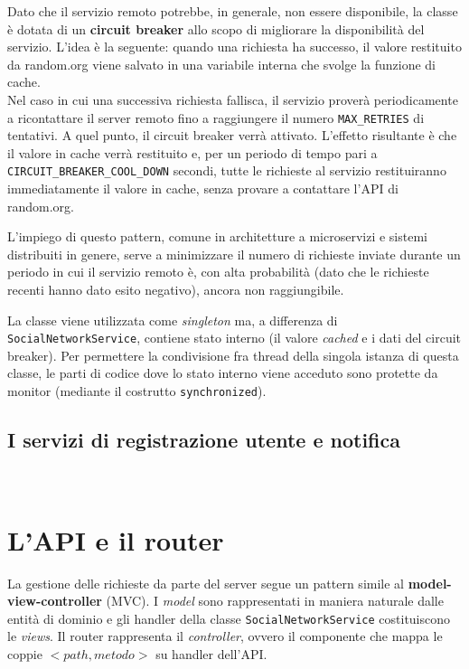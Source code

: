 \documentclass[a4paper,8pt]{article} %
\def\code#1{\texttt{#1}}
\begin{document}
\par Dato che il servizio remoto potrebbe, in generale, non essere disponibile, la classe è dotata di un \textbf{circuit breaker} allo scopo di migliorare la disponibilità del servizio.
L'idea è la seguente: quando una richiesta ha successo, il valore restituito da random.org viene salvato in una variabile interna che svolge la funzione di cache.\\
Nel caso in cui una successiva richiesta fallisca,
il servizio proverà periodicamente a ricontattare il server remoto fino a raggiungere il numero \code{MAX\_RETRIES} di tentativi. A quel punto, il circuit breaker verrà attivato. L'effetto risultante è che il valore in cache verrà
restituito e, per un periodo di tempo pari a \code{CIRCUIT\_BREAKER\_COOL\_DOWN} secondi, tutte le richieste al servizio restituiranno immediatamente il valore in cache, senza provare a contattare l'API di random.org.
\par L'impiego di questo pattern, comune in architetture a microservizi e sistemi distribuiti in genere, serve a minimizzare il numero di richieste inviate durante un periodo in cui il servizio remoto è, con alta probabilità (dato che le richieste recenti hanno dato esito negativo), ancora non raggiungibile.

\par La classe viene utilizzata come \emph{singleton} ma, a differenza di \code{SocialNetworkService}, contiene stato interno (il valore \emph{cached} e i dati del circuit breaker).
Per permettere la condivisione fra thread della singola istanza di questa classe, le parti di codice dove lo stato interno viene acceduto sono protette da monitor (mediante il costrutto \code{synchronized}).

\subsection{I servizi di registrazione utente e notifica}\quad \\




\section{L'API e il router}
La gestione delle richieste da parte del server segue un pattern simile al \textbf{model-view-controller} (MVC).
I \emph{model} sono rappresentati in maniera naturale dalle entità di dominio e gli handler della classe \code{SocialNetworkService} costituiscono
le \emph{views}. Il router rappresenta il \emph{controller}, ovvero il componente che mappa le coppie $<path, metodo>$ su handler dell'API.
\end{document}
